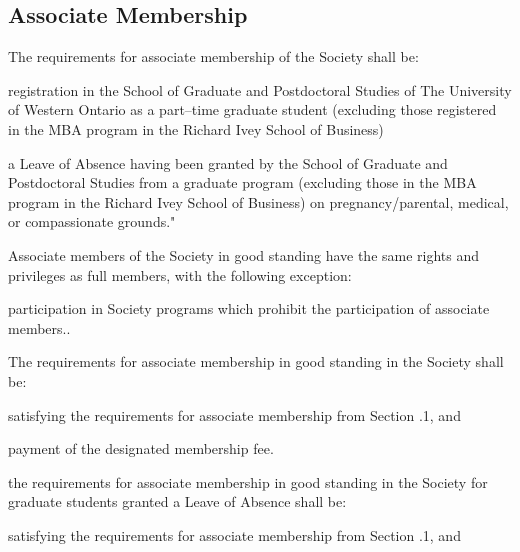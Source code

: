 \subsection{Associate Membership}
	\begin{longenum}[label*=\thesubsection.\arabic*., align=left]
  	\item  The requirements for associate membership of the Society shall be:
    	\begin{longenum}[label*=\arabic*., align=left]
    	\item registration in the School of Graduate and Postdoctoral Studies of The University of Western Ontario as a part--time graduate student (excluding those registered in the MBA program in the Richard Ivey School of Business) 
        \item a Leave of Absence having been granted by the School of Graduate and Postdoctoral Studies from a graduate program (excluding those in the MBA program in the Richard Ivey School of Business) on pregnancy/parental, medical, or compassionate grounds."
  	\end{longenum}
    \item Associate members of the Society in good standing have the same rights and privileges as full members, with the following exception:
    	\begin{longenum}[label*=\arabic*., align=left]
    	\item participation in Society programs which prohibit the participation of associate members..
  	\end{longenum}
    \item The requirements for associate membership in good standing in the Society shall be:
    \begin{longenum}[label*=\arabic*., align=left]
    	\item satisfying the requirements for associate membership from Section .1, and
        \item payment of the designated membership fee.
  	\end{longenum}
    \item  the requirements for associate membership in good standing in the Society for graduate students granted a Leave of Absence shall be:
        \begin{longenum}[label*=\arabic*., align=left]
    	\item satisfying the requirements for associate membership from Section .1, and

  	\end{longenum}
\end{longenum}

